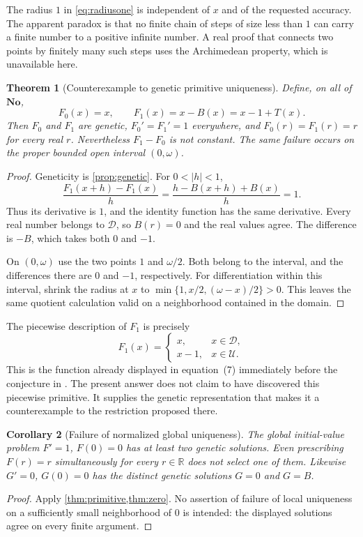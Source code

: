 \documentclass[11pt,letterpaper]{article}
\numberwithin{equation}{section}
\newtheorem{theorem}{Theorem}[section]
\newtheorem{corollary}[theorem]{Corollary}
\theoremstyle{definition}
\theoremstyle{remark}
\newcommand{\No}{\mathbf{No}}
\newcommand{\R}{\mathbb{R}}
\newcommand{\U}{\mathcal{U}}
\newcommand{\D}{\mathcal{D}}
\newcommand{\source}[2]{\cite[#1]{#2}}
\begin{document}
The radius $1$ in \eqref{eq:radiusone} is independent of $x$ and of the
requested accuracy. The apparent paradox is that no finite chain of
steps of size less than $1$ can carry a finite number to a positive infinite
number. A real proof that connects two points by finitely many such steps
uses the Archimedean property, which is unavailable here.

\begin{theorem}[Counterexample to genetic primitive uniqueness]\label{thm:primitive}
Define, on all of $\No$,
\begin{equation}\label{eq:F}
 F_0(x)=x,\qquad F_1(x)=x-B(x)=x-1+T(x).
\end{equation}
Then $F_0$ and $F_1$ are genetic, $F_0'=F_1'=1$ everywhere, and
$F_0(r)=F_1(r)=r$ for every real $r$. Nevertheless $F_1-F_0$ is not constant.
The same failure occurs on the proper bounded open interval $(0,\omega)$.
\end{theorem}
\begin{proof}
Geneticity is \cref{prop:genetic}. For $0<|h|<1$,
\[
 \frac{F_1(x+h)-F_1(x)}h
 =\frac{h-B(x+h)+B(x)}h=1.
\]
Thus its derivative is $1$, and the identity function has the same
derivative. Every real number belongs to $\D$, so $B(r)=0$ and the real
values agree. The difference is $-B$, which takes both $0$ and $-1$.

On $(0,\omega)$ use the two points $1$ and $\omega/2$. Both belong to the
interval, and the differences there are $0$ and $-1$, respectively.
For differentiation within this interval, shrink the radius at $x$ to
$\min\{1,x/2,(\omega-x)/2\}>0$. This leaves the same quotient calculation
valid on a neighborhood contained in the domain.
\end{proof}

The piecewise description of $F_1$ is precisely
\[
 F_1(x)=\begin{cases}x,&x\in\D,\\x-1,&x\in\U.\end{cases}
\]
This is the function already displayed in equation~(7) immediately before
the conjecture in \source{p.~37}{RSS}. The present answer does not claim to
have discovered this piecewise primitive. It supplies the genetic
representation that makes it a counterexample to the restriction proposed
there.

\begin{corollary}[Failure of normalized global uniqueness]
The global initial-value problem $F'=1$, $F(0)=0$ has at least two genetic
solutions. Even prescribing $F(r)=r$ simultaneously for every $r\in\R$
does not select one of them. Likewise $G'=0$, $G(0)=0$ has the distinct
genetic solutions $G=0$ and $G=B$.
\end{corollary}
\begin{proof}
Apply \cref{thm:primitive,thm:zero}. No assertion of failure of local
uniqueness on a sufficiently small neighborhood of $0$ is intended:
the displayed solutions agree on every finite argument.
\end{proof}
\end{document}
